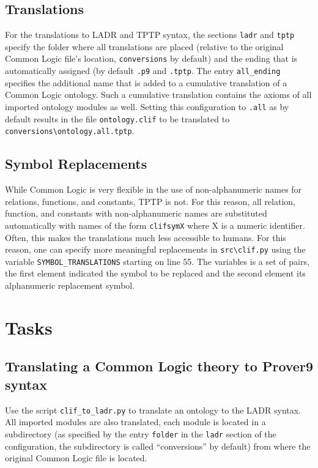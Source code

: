 \documentclass{article}
\begin{document}
\subsection{Translations}
For the translations to LADR and TPTP syntax, the sections \texttt{ladr} and \texttt{tptp} specify the folder where all translations are placed (relative to the original Common Logic file's location, \texttt{conversions} by default) and the ending that is automatically assigned (by default \texttt{.p9} and \texttt{.tptp}. The entry \texttt{all\_ending} specifies the additional name that is added to a cumulative translation of a Common Logic ontology. Such a cumulative translation contains the axioms of all imported ontology modules as well. Setting this configuration to \texttt{.all} as by default results in the file \texttt{ontology.clif} to be translated to \texttt{conversions\textbackslash ontology.all.tptp}.

\subsection{Symbol Replacements}

While Common Logic is very flexible in the use of non-alphanumeric names for relations, functions, and constants, TPTP is not. For this reason, all relation, function, and constants with non-alphanumeric names are substituted automatically with names of the form \texttt{clifsymX} where X is a numeric identifier. Often, this makes the translations much less accessible to humans. For this reason, one can specify more meaningful replacements in \texttt{src\textbackslash clif.py} using the variable \texttt{SYMBOL\_TRANSLATIONS} starting on line 55. The variables is a set of pairs, the first element indicated the symbol to be replaced and the second element its alphanumeric replacement symbol.

\section{Tasks}

\subsection{Translating a Common Logic theory to Prover9 syntax}

Use the script \texttt{clif\_to\_ladr.py} to translate an ontology to the LADR syntax.  
All imported modules are also translated, each module is located in a subdirectory (as specified by the entry \texttt{folder} in the \texttt{ladr} section of the configuration, the subdirectory is called ``conversions'' by default) from where the original Common Logic file is located.
\end{document}
